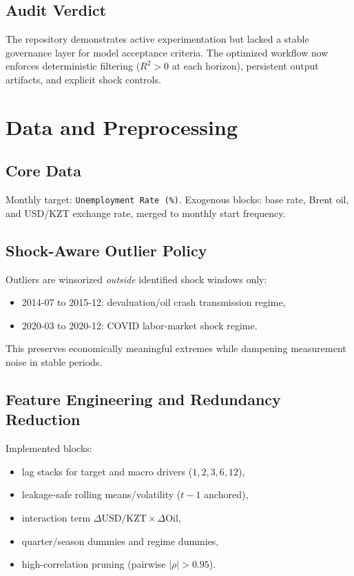 \documentclass[11pt,a4paper]{article}
\begin{document}
\subsection{Audit Verdict}
The repository demonstrates active experimentation but lacked a stable governance layer for model acceptance criteria. The optimized workflow now enforces deterministic filtering (\(R^2>0\) at each horizon), persistent output artifacts, and explicit shock controls.

\section{Data and Preprocessing}
\subsection{Core Data}
Monthly target: \texttt{Unemployment Rate (\%)}. Exogenous blocks: base rate, Brent oil, and USD/KZT exchange rate, merged to monthly start frequency.

\subsection{Shock-Aware Outlier Policy}
Outliers are winsorized \emph{outside} identified shock windows only:
\begin{itemize}
\item 2014-07 to 2015-12: devaluation/oil crash transmission regime,
\item 2020-03 to 2020-12: COVID labor-market shock regime.
\end{itemize}
This preserves economically meaningful extremes while dampening measurement noise in stable periods.

\subsection{Feature Engineering and Redundancy Reduction}
Implemented blocks:
\begin{itemize}
\item lag stacks for target and macro drivers (\(1,2,3,6,12\)),
\item leakage-safe rolling means/volatility (\(t-1\) anchored),
\item interaction term \(\Delta \text{USD/KZT}\times \Delta \text{Oil}\),
\item quarter/season dummies and regime dummies,
\item high-correlation pruning (pairwise \(|\rho|>0.95\)).
\end{itemize}
\end{document}
